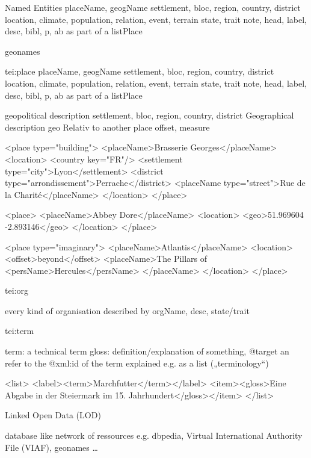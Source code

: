 \begin{frame}{Named Entities}
placeName, geogName 
settlement, bloc, region, country, district 
location, climate, population, relation, event, terrain 
state, trait
note, head, label, desc, bibl, p, ab
as part of a listPlace

geonames 

tei:place
placeName, geogName 
settlement, bloc, region, country, district 
location, climate, population, relation, event, terrain 
state, trait
note, head, label, desc, bibl, p, ab as part of a listPlace

geopolitical description
settlement, bloc, region, country, district
Geographical description
geo
Relativ to another place
offset, measure

\begin{xmlcode}
<place type="building">
 <placeName>Brasserie Georges</placeName>
 <location>
  <country key="FR"/>
  <settlement type="city">Lyon</settlement>
  <district type="arrondissement">Perrache</district>
  <placeName type="street">Rue de la Charité</placeName>
 </location>
</place>

<place>
  <placeName>Abbey Dore</placeName>
  <location>
    <geo>51.969604 -2.893146</geo>
  </location>
</place>

<place type="imaginary">
 <placeName>Atlantis</placeName>
 <location>
  <offset>beyond</offset>
  <placeName>The Pillars of <persName>Hercules</persName>
  </placeName>
 </location>
</place>
\end{xmlcode}


tei:org

every kind of organisation
described by orgName, desc, state/trait

tei:term

term: a technical term
gloss: definition/explanation of something, @target  an refer to the @xml:id of the term explained
e.g. as a list („terminology“)
\begin{xmlcode}
<list>
  <label><term>Marchfutter</term></label>
  <item><gloss>Eine Abgabe in der Steiermark im 15. Jahrhundert</gloss></item>
</list>
\end{xmlcode}

Linked Open Data (LOD)

database like network of ressources
e.g. dbpedia, Virtual International Authority File (VIAF), geonames \dots

\end{frame}




